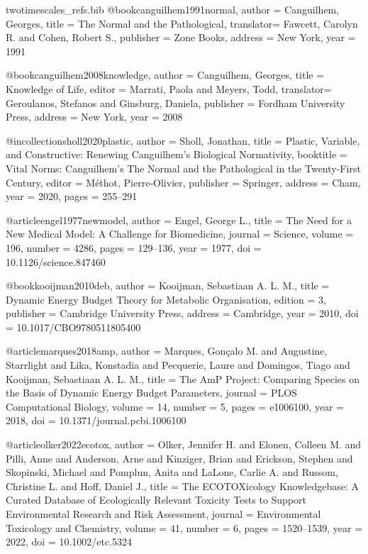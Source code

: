 \begin{filecontents*}{twotimescales_refs.bib}
	@book{canguilhem1991normal,
		author    = {Canguilhem, Georges},
		title     = {The Normal and the Pathological},
		translator= {Fawcett, Carolyn R. and Cohen, Robert S.},
		publisher = {Zone Books},
		address   = {New York},
		year      = {1991}
	}
	
	@book{canguilhem2008knowledge,
		author    = {Canguilhem, Georges},
		title     = {Knowledge of Life},
		editor    = {Marrati, Paola and Meyers, Todd},
		translator= {Geroulanos, Stefanos and Ginsburg, Daniela},
		publisher = {Fordham University Press},
		address   = {New York},
		year      = {2008}
	}
	
	@incollection{sholl2020plastic,
		author    = {Sholl, Jonathan},
		title     = {Plastic, Variable, and Constructive: Renewing Canguilhem's Biological Normativity},
		booktitle = {Vital Norms: Canguilhem's The Normal and the Pathological in the Twenty-First Century},
		editor    = {M{\'e}thot, Pierre-Olivier},
		publisher = {Springer},
		address   = {Cham},
		year      = {2020},
		pages     = {255--291}
	}
	
	@article{engel1977newmodel,
		author  = {Engel, George L.},
		title   = {The Need for a New Medical Model: A Challenge for Biomedicine},
		journal = {Science},
		volume  = {196},
		number  = {4286},
		pages   = {129--136},
		year    = {1977},
		doi     = {10.1126/science.847460}
	}
	
	@book{kooijman2010deb,
		author    = {Kooijman, Sebastiaan A. L. M.},
		title     = {Dynamic Energy Budget Theory for Metabolic Organisation},
		edition   = {3},
		publisher = {Cambridge University Press},
		address   = {Cambridge},
		year      = {2010},
		doi       = {10.1017/CBO9780511805400}
	}
	
	@article{marques2018amp,
		author  = {Marques, Gon{\c{c}}alo M. and Augustine, Starrlight and Lika, Konstadia and Pecquerie, Laure and Domingos, Tiago and Kooijman, Sebastiaan A. L. M.},
		title   = {The AmP Project: Comparing Species on the Basis of Dynamic Energy Budget Parameters},
		journal = {PLOS Computational Biology},
		volume  = {14},
		number  = {5},
		pages   = {e1006100},
		year    = {2018},
		doi     = {10.1371/journal.pcbi.1006100}
	}
	
	@article{olker2022ecotox,
		author  = {Olker, Jennifer H. and Elonen, Colleen M. and Pilli, Anne and Anderson, Arne and Kinziger, Brian and Erickson, Stephen and Skopinski, Michael and Pomplun, Anita and LaLone, Carlie A. and Russom, Christine L. and Hoff, Daniel J.},
		title   = {The ECOTOXicology Knowledgebase: A Curated Database of Ecologically Relevant Toxicity Tests to Support Environmental Research and Risk Assessment},
		journal = {Environmental Toxicology and Chemistry},
		volume  = {41},
		number  = {6},
		pages   = {1520--1539},
		year    = {2022},
		doi     = {10.1002/etc.5324}
	}
	

\end{filecontents*}

